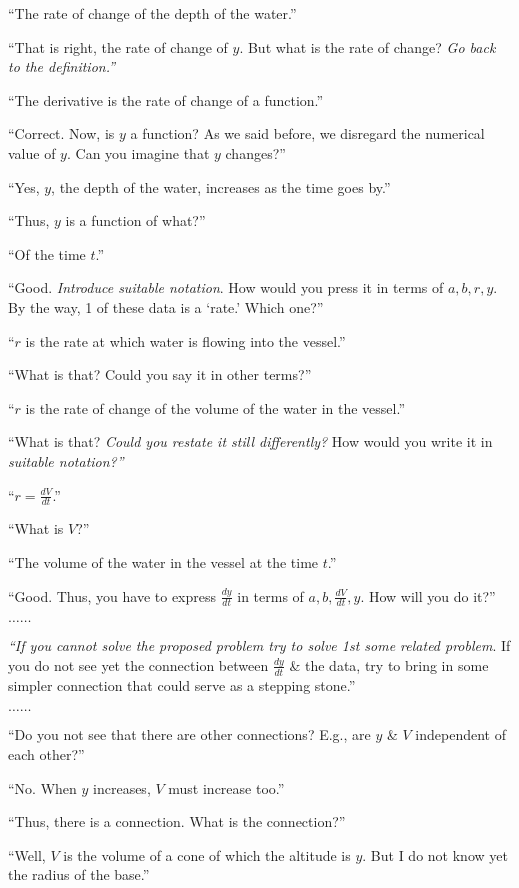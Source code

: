 \documentclass[oneside]{book}
\numberwithin{equation}{section}
\begin{document}
``The rate of change of the depth of the water.''

``That is right, the rate of change of $y$. But what is the rate of change? \textit{Go back to the definition.''}

``The derivative is the rate of change of a function.''

``Correct. Now, is $y$ a function? As we said before, we disregard the numerical value of $y$. Can you imagine that $y$ changes?''

``Yes, $y$, the depth of the water, increases as the time goes by.''

``Thus, $y$ is a function of what?''

``Of the time $t$.''

``Good. \textit{Introduce suitable notation}. How would you press it in terms of $a,b,r,y$. By the way, 1 of these data is a `rate.' Which one?''

``$r$ is the rate at which water is flowing into the vessel.''

``What is that? Could you say it in other terms?''

``$r$ is the rate of change of the volume of the water in the vessel.''

``What is that? \textit{Could you restate it still differently?} How would you write it in \textit{suitable notation?''}

``$r = \frac{dV}{dt}$.''

``What is $V$?''

``The volume of the water in the vessel at the time $t$.''

``Good. Thus, you have to express $\frac{dy}{dt}$ in terms of $a,b,\frac{dV}{dt},y$. How will you do it?''

$\ldots\ldots$

\textit{``If you cannot solve the proposed problem try to solve 1st some related problem}. If you do not see yet the connection between $\frac{dy}{dt}$ \& the data, try to bring in some simpler connection that could serve as a stepping stone.''

$\ldots\ldots$

``Do you not see that there are other connections? E.g., are $y$ \& $V$ independent of each other?''

``No. When $y$ increases, $V$ must increase too.''

``Thus, there is a connection. What is the connection?''

``Well, $V$ is the volume of a cone of which the altitude is $y$. But I do not know yet the radius of the base.''
\end{document}

